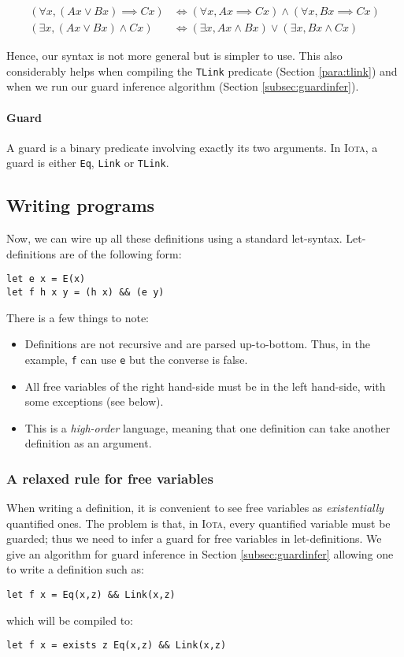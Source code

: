\documentclass[10pt,a4paper]{article}
\newcommand\Iota{\textsc{Iota}}
\newcommand{\ocaml}{\texttt}
\begin{document}
\begin{align*}
  (\forall x, (A x \lor B x) \implies C x) &\iff (\forall x, A x \implies C x) \land (\forall x, B x \implies C x)\\
  (\exists x, (A x \lor B x ) \land C x) &\iff (\exists x, A x \land B x) \lor (\exists x, B x \land C x)
\end{align*}

Hence, our syntax is not more general but is simpler to use. This also considerably helps when compiling the \ocaml{TLink} predicate (Section \ref{para:tlink}) and when we run our guard inference algorithm (Section \ref{subsec:guardinfer}).

\paragraph{Guard}
A guard is a binary predicate involving exactly its two arguments. In \Iota{}, a guard is either \ocaml{Eq}, \ocaml{Link} or \ocaml{TLink}.

\subsection{Writing programs}
Now, we can wire up all these definitions using a standard let-syntax. Let-definitions are of the following form:
\begin{verbatim}
let e x = E(x)
let f h x y = (h x) && (e y)
\end{verbatim}
There is a few things to note:
\begin{itemize}
\item Definitions are not recursive and are parsed up-to-bottom. Thus, in the example, \ocaml{f} can use \ocaml{e} but the converse is false.
\item All free variables of the right hand-side must be in the left hand-side, with some exceptions (see below).
\item This is a \emph{high-order} language, meaning that one definition can take another definition as an argument.
\end{itemize}

\subsubsection{A relaxed rule for free variables}
\label{sec:arelaxedrule}
When writing a definition, it is convenient to see free variables as \emph{existentially} quantified ones. The problem is that, in \Iota{}, every quantified variable must be guarded; thus we need to infer a guard for free variables in let-definitions. We give an algorithm for guard inference in Section \ref{subsec:guardinfer} allowing one to write a definition such as:
\begin{verbatim}
let f x = Eq(x,z) && Link(x,z)
\end{verbatim}
which will be compiled to:
\begin{verbatim}
let f x = exists z Eq(x,z) && Link(x,z)
\end{verbatim}
\end{document}
